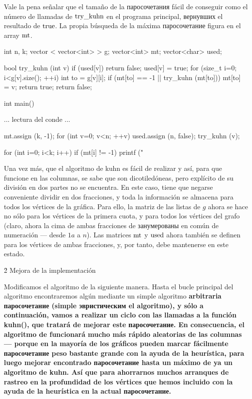 Vale la pena señalar que el tamaño de la паросочетания fácil de conseguir como el número de llamadas de $\rm try\_kuhn$ en el programa principal, вернувших el resultado de $\rm true$. La propia búsqueda de la máxima паросочетание figura en el array $\rm mt$.

\code
int n, k;
vector < vector<int> > g;
vector<int> mt;
vector<char> used;

bool try_kuhn (int v) {
if (used[v]) return false;
used[v] = true;
for (size_t i=0; i<g[v].size(); ++i) {
int to = g[v][i];
if (mt[to] == -1 || try_kuhn (mt[to])) {
mt[to] = v;
return true;
}
}
return false;
}

int main() {
... lectura del conde ...

mt.assign (k, -1);
for (int v=0; v<n; ++v) {
used.assign (n, false);
try_kuhn (v);
}

for (int i=0; i<k; i++)
if (mt[i] != -1)
printf ("%
}
\endcode

Una vez más, que el algoritmo de kuhn es fácil de realizar y así, para que funcione en las columnas, se sabe que son dicotiledóneas, pero explícito de su división en dos partes no se encuentra. En este caso, tiene que negarse conveniente dividir en dos fracciones, y toda la información se almacena para todos los vértices de la gráfica. Para ello, la matriz de las listas de $g$ ahora se hace no sólo para los vértices de la primera cuota, y para todos los vértices del grafo (claro, ahora la cima de ambas fracciones de занумерованы en común de numeración --- desde $1 a$ a $n$). Las matrices $\rm mt$ y $\rm used$ ahora también se definen para los vértices de ambas fracciones, y, por tanto, debe mantenerse en este estado.


\h2{ Mejora de la implementación }

Modificamos el algoritmo de la siguiente manera. Hasta el bucle principal del algoritmo encontraremos algún mediante un simple algoritmo \bf{arbitraria паросочетание} (simple \bf{эвристическим el algoritmo}), y sólo a continuación, vamos a realizar un ciclo con las llamadas a la función kuhn(), que tratará de mejorar este паросочетание. En consecuencia, el algoritmo de funcionará mucho más rápido aleatorias de las columnas --- porque en la mayoría de los gráficos pueden marcar fácilmente паросочетание peso bastante grande con la ayuda de la heurística, para luego mejorar encontrado паросочетание hasta un máximo de ya un algoritmo de kuhn. Así que para ahorrarnos muchos arranques de rastreo en la profundidad de los vértices que hemos incluido con la ayuda de la heurística en la actual паросочетание.

